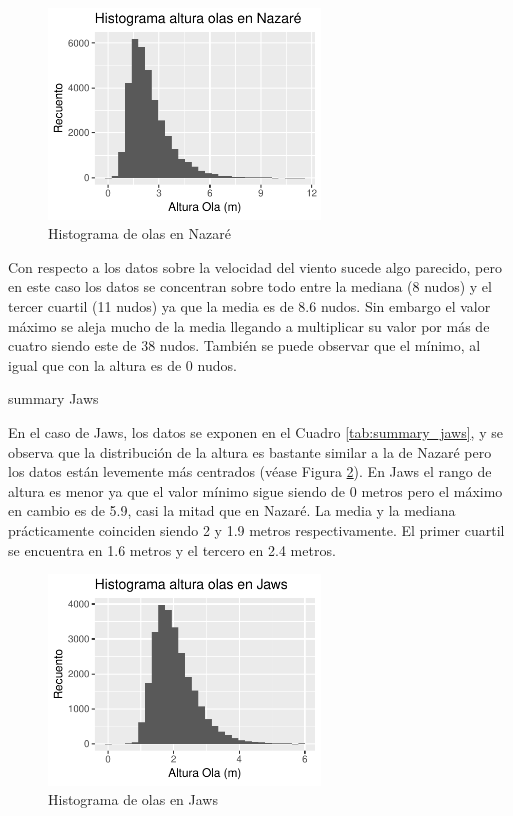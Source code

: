 \begin{figure}[H]
    \centering
    \includegraphics[height=5.6cm]{./figures/nazare_hist_wave.pdf}
    \caption{Histograma de olas en Nazaré}
    \label{fig:hist_waves_nazare}
\end{figure}

Con respecto a los datos sobre la velocidad del viento sucede algo parecido, pero en este caso los datos se concentran sobre todo entre la mediana (8 nudos) y el tercer cuartil (11 nudos) ya que la media es de 8.6 nudos. Sin embargo el valor máximo se aleja mucho de la media llegando a multiplicar su valor por más de cuatro siendo este de 38 nudos. También se puede observar que el mínimo, al igual que con la altura es de 0 nudos.


\begin{table}[htbp]
    \centering
    
    \caption{summary Jaws}
    \label{tab:summary_jaws}
\end{table}


En el caso de Jaws, los datos se exponen en el Cuadro \ref{tab:summary_jaws}, y se observa que la distribución de la altura es bastante similar a la de Nazaré pero los datos están levemente más centrados (véase Figura \ref{fig:hist_waves_jaws}). En Jaws el rango de altura es menor ya que el valor mínimo sigue siendo de 0 metros pero el máximo en cambio es de 5.9, casi la mitad que en Nazaré. La media y la mediana prácticamente coinciden siendo 2 y 1.9 metros respectivamente. El primer cuartil se encuentra en 1.6 metros y el tercero en 2.4 metros.

\begin{figure}[H]
    \centering
    \includegraphics[height=5.6cm]{./figures/jaws_hist_wave.pdf}
    \caption{Histograma de olas en Jaws}
    \label{fig:hist_waves_jaws}
\end{figure}

